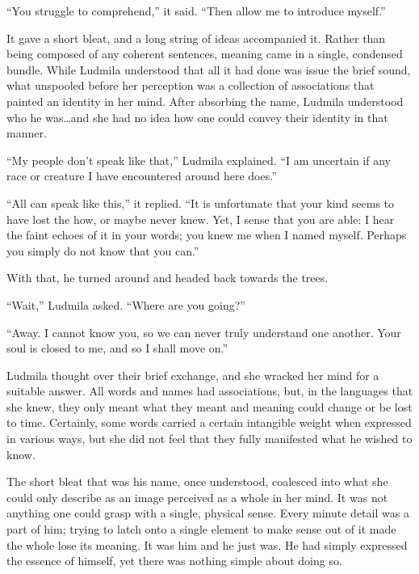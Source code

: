  

“You struggle to comprehend,” it said. “Then allow me to introduce myself.”

 

It gave a short bleat, and a long string of ideas accompanied it. Rather than being composed of any coherent sentences, meaning came in a single, condensed bundle. While Ludmila understood that all it had done was issue the brief sound, what unspooled before her perception was a collection of associations that painted an identity in her mind. After absorbing the name, Ludmila understood who he was…and she had no idea how one could convey their identity in that manner.

 

“My people don’t speak like that,” Ludmila explained. “I am uncertain if any race or creature I have encountered around here does.”

 

“All can speak like this,” it replied. “It is unfortunate that your kind seems to have lost the how, or maybe never knew. Yet, I sense that you are able: I hear the faint echoes of it in your words; you knew me when I named myself. Perhaps you simply do not know that you can.”

 

With that, he turned around and headed back towards the trees.

 

“Wait,” Ludmila asked. “Where are you going?”

 

“Away. I cannot know you, so we can never truly understand one another. Your soul is closed to me, and so I shall move on.”

 

Ludmila thought over their brief exchange, and she wracked her mind for a suitable answer. All words and names had associations, but, in the languages that she knew, they only meant what they meant and meaning could change or be lost to time. Certainly, some words carried a certain intangible weight when expressed in various ways, but she did not feel that they fully manifested what he wished to know.

 

The short bleat that was his name, once understood, coalesced into what she could only describe as an image perceived as a whole in her mind. It was not anything one could grasp with a single, physical sense. Every minute detail was a part of him; trying to latch onto a single element to make sense out of it made the whole lose its meaning. It was him and he just was. He had simply expressed the essence of himself, yet there was nothing simple about doing so.

